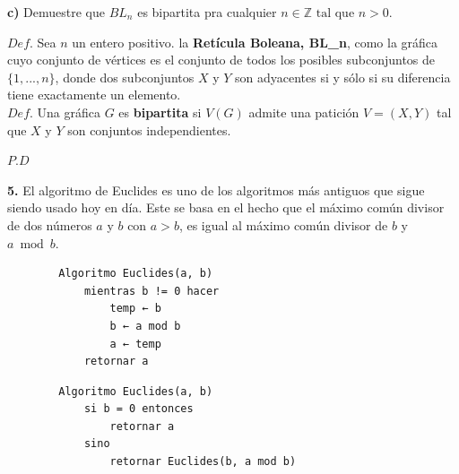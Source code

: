 \documentclass[12pt]{article}
\begin{document}
\textbf{c)} Demuestre que $BL_n$ es bipartita pra cualquier $n \in \mathbb{Z} \text{ tal que } n > 0$.

\begin{tcolorbox}[title=\textbf{Definiciones}, colback=blue!15!white, colframe=black!]
    $Def$. Sea $n$ un entero positivo. la \textbf{Retícula Boleana, BL\_n}, como
    la gráfica cuyo conjunto de vértices es el conjunto de todos los posibles subconjuntos
    de $\{1, ..., n\}$, donde dos subconjuntos $X$ y $Y$ son adyacentes si y sólo si su diferencia
    tiene exactamente un elemento.\\

    $Def.$ Una gráfica $G$ es \textbf{bipartita} si $V(G)$ admite una patición $V = (X, Y)$ tal que $X$ y $Y$ son conjuntos independientes.
\end{tcolorbox}

$P.D$ 

\vspace{1cm}

\textbf{5.} El algoritmo de Euclides es uno de los algoritmos más antiguos que sigue siendo usado hoy en
día. Este se basa en el hecho que el máximo común divisor de dos números $a$ y $b$ con $a > b$, es igual
al máximo común divisor de $b$ y $a \bmod b$.\\

\begin{tcolorbox}[title=\textbf{Pseudocódigo del Algoritmo de Euclides (Iterativo)}, colback=gray!10!white, colframe=black!]
    \begin{verbatim}
        Algoritmo Euclides(a, b)
            mientras b != 0 hacer
                temp ← b
                b ← a mod b
                a ← temp
            retornar a
    \end{verbatim}
\end{tcolorbox}

\begin{tcolorbox}[title=\textbf{Pseudocódigo del Algoritmo de Euclides (Recursivo)}, colback=gray!10!white, colframe=black!]
    \begin{verbatim}
        Algoritmo Euclides(a, b)
            si b = 0 entonces
                retornar a
            sino
                retornar Euclides(b, a mod b)
    \end{verbatim}
\end{tcolorbox}
\end{document}
